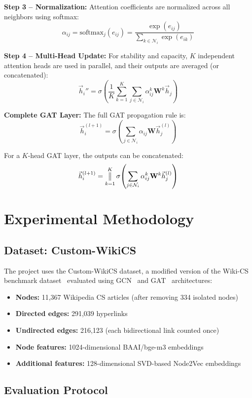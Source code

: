 \textbf{Step 3 -- Normalization:} Attention coefficients are normalized across all neighbors using softmax:
\[
\alpha_{ij} = \text{softmax}_j(e_{ij}) = \frac{\exp(e_{ij})}{\sum_{k \in \mathcal{N}_i} \exp(e_{ik})}
\]

\textbf{Step 4 -- Multi-Head Update:} For stability and capacity, $K$ independent attention heads are used in parallel, and their outputs are averaged (or concatenated):
\[
\vec{h}_i'' = \sigma\!\left(\frac{1}{K} \sum_{k=1}^K \sum_{j \in \mathcal{N}_i} \alpha_{ij}^k \mathbf{W}^k \vec{h}_j \right)
\]

\textbf{Complete GAT Layer:} The full GAT propagation rule is:
\[
\vec{h}_i^{(l+1)} = \sigma\!\left(\sum_{j \in \mathcal{N}_i} \alpha_{ij} \mathbf{W} \vec{h}_j^{(l)}\right)
\]

For a $K$-head GAT layer, the outputs can be concatenated:
\[
\vec{h}_i^{(l+1)} = \bigparallel_{k=1}^K \sigma\!\left(\sum_{j \in \mathcal{N}_i} \alpha_{ij}^k \mathbf{W}^k \vec{h}_j^{(l)}\right)
\]


\section{Experimental Methodology}

\subsection{Dataset: Custom-WikiCS}

The project uses the Custom-WikiCS dataset, a modified version of the Wiki-CS benchmark dataset~\cite{mernyei2020wikics} evaluated using GCN~\cite{kipf2017semi} and GAT~\cite{velickovic2018graph} architectures:

\begin{itemize}
    \item \textbf{Nodes:} 11,367 Wikipedia CS articles (after removing 334 isolated nodes)
    \item \textbf{Directed edges:} 291,039 hyperlinks
    \item \textbf{Undirected edges:} 216,123 (each bidirectional link counted once)
    \item \textbf{Node features:} 1024-dimensional BAAI/bge-m3 embeddings
    \item \textbf{Additional features:} 128-dimensional SVD-based Node2Vec embeddings
\end{itemize}

\subsection{Evaluation Protocol}

